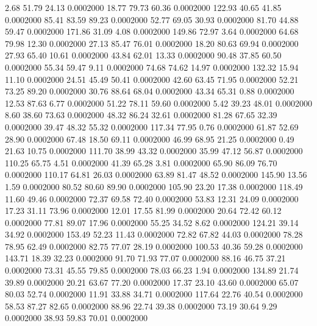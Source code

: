    2.68   51.79   24.13   0.0002000
  18.77   79.73   60.36   0.0002000
 122.93   40.65   41.85   0.0002000
  85.41   83.59   89.23   0.0002000
  52.77   69.05   30.93   0.0002000
  81.70   44.88   59.47   0.0002000
 171.86   31.09    4.08   0.0002000
 149.86   72.97    3.64   0.0002000
  64.68   79.98   12.30   0.0002000
  27.13   85.47   76.01   0.0002000
  18.20   80.63   69.94   0.0002000
  27.93   65.40   10.61   0.0002000
  43.84   62.01   13.33   0.0002000
  90.48   37.85   60.50   0.0002000
  55.34   59.47    9.11   0.0002000
  74.68   74.62   14.97   0.0002000
 132.32   15.94   11.10   0.0002000
  24.51   45.49   50.41   0.0002000
  42.60   63.45   71.95   0.0002000
  52.21   73.25   89.20   0.0002000
  30.76   88.64   68.04   0.0002000
  43.34   65.31    0.88   0.0002000
  12.53   87.63    6.77   0.0002000
  51.22   78.11   59.60   0.0002000
   5.42   39.23   48.01   0.0002000
   8.60   38.60   73.63   0.0002000
  48.32   86.24   32.61   0.0002000
  81.28   67.65   32.39   0.0002000
  39.47   48.32   55.32   0.0002000
 117.34   77.95    0.76   0.0002000
  61.87   52.69   28.90   0.0002000
  67.48   18.50   69.11   0.0002000
  46.99   68.95   21.25   0.0002000
   0.49   21.63   10.75   0.0002000
 111.70   38.99   43.32   0.0002000
  35.99   47.12   56.87   0.0002000
 110.25   65.75    4.51   0.0002000
  41.39   65.28    3.81   0.0002000
  65.90   86.09   76.70   0.0002000
 110.17   64.81   26.03   0.0002000
  63.89   81.47   48.52   0.0002000
 145.90   13.56    1.59   0.0002000
  80.52   80.60   89.90   0.0002000
 105.90   23.20   17.38   0.0002000
 118.49   11.60   49.46   0.0002000
  72.37   69.58   72.40   0.0002000
  53.83   12.31   24.09   0.0002000
  17.23   31.11   73.96   0.0002000
  12.01   17.55   81.99   0.0002000
  20.64   72.42   60.12   0.0002000
  77.81   89.07   17.96   0.0002000
  55.25   34.52    8.62   0.0002000
 124.21   39.14   34.92   0.0002000
 153.49   52.23   11.43   0.0002000
  72.82   67.82   44.03   0.0002000
  78.28   78.95   62.49   0.0002000
  82.75   77.07   28.19   0.0002000
 100.53   40.36   59.28   0.0002000
 143.71   18.39   32.23   0.0002000
  91.70   71.93   77.07   0.0002000
  88.16   46.75   37.21   0.0002000
  73.31   45.55   79.85   0.0002000
  78.03   66.23    1.94   0.0002000
 134.89   21.74   39.89   0.0002000
  20.21   63.67   77.20   0.0002000
  17.37   23.10   43.60   0.0002000
  65.07   80.03   52.74   0.0002000
  11.91   33.88   34.71   0.0002000
 117.64   22.76   40.54   0.0002000
  58.53   87.27   82.65   0.0002000
  88.96   22.74   39.38   0.0002000
  73.19   30.64    9.29   0.0002000
  38.93   59.83   70.01   0.0002000
